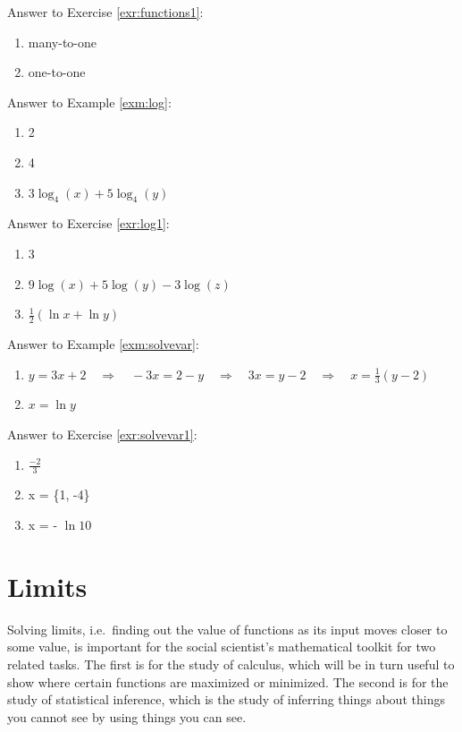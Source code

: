 \documentclass[]{book}
\theoremstyle{definition}
\theoremstyle{definition}
\theoremstyle{definition}
\theoremstyle{remark}
\begin{document}
Answer to Exercise \ref{exr:functions1}:

\begin{enumerate}
\def\labelenumi{\arabic{enumi}.}
\item
  many-to-one
\item
  one-to-one
\end{enumerate}

Answer to Example \ref{exm:log}:

\begin{enumerate}
\def\labelenumi{\arabic{enumi}.}
\item
  2
\item
  4
\item
  \(3\log_4(x) + 5\log_4(y)\)
\end{enumerate}

Answer to Exercise \ref{exr:log1}:

\begin{enumerate}
\def\labelenumi{\arabic{enumi}.}
\item
  3
\item
  \(9\log(x) + 5\log(y) - 3\log(z)\)
\item
  \(\frac{1}{2}(\ln{x} + \ln{y})\)
\end{enumerate}

Answer to Example \ref{exm:solvevar}:

\begin{enumerate}
\def\labelenumi{\arabic{enumi}.}
\item
  \(y=3x+2 \quad\Longrightarrow\quad -3x=2-y \quad\Longrightarrow\quad 3x=y-2 \quad\Longrightarrow\quad x=\frac{1}{3}(y-2)\)
\item
  \(x = \ln{y}\)
\end{enumerate}

Answer to Exercise \ref{exr:solvevar1}:

\begin{enumerate}
\def\labelenumi{\arabic{enumi}.}
\item
  \(\frac{-2}{3}\)
\item
  x = \{1, -4\}
\item
  x = - \(\ln10\)
\end{enumerate}

\chapter{Limits}\label{limits-precalc}

Solving limits, i.e.~finding out the value of functions as its input
moves closer to some value, is important for the social scientist's
mathematical toolkit for two related tasks. The first is for the study
of calculus, which will be in turn useful to show where certain
functions are maximized or minimized. The second is for the study of
statistical inference, which is the study of inferring things about
things you cannot see by using things you can see.
\end{document}
